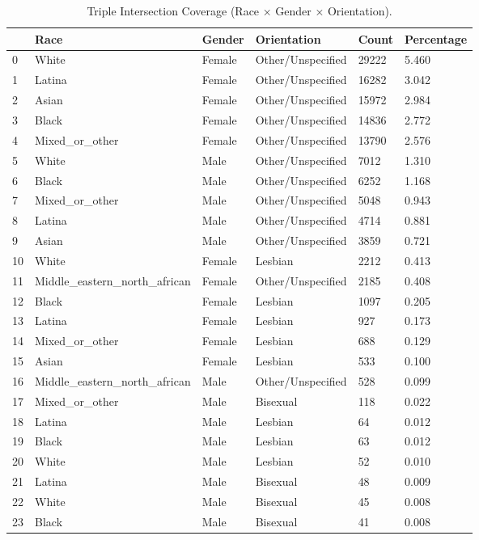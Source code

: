 \begin{table}[htbp]
\centering
\caption{Triple Intersection Coverage (Race × Gender × Orientation).}
\label{tab:eda_intersections_rgo}
\begin{tabular}{llllll}
\toprule
 & Race & Gender & Orientation & Count & Percentage \\
\midrule
0 & White & Female & Other/Unspecified & 29222 & 5.460 \\
1 & Latina & Female & Other/Unspecified & 16282 & 3.042 \\
2 & Asian & Female & Other/Unspecified & 15972 & 2.984 \\
3 & Black & Female & Other/Unspecified & 14836 & 2.772 \\
4 & Mixed\_or\_other & Female & Other/Unspecified & 13790 & 2.576 \\
5 & White & Male & Other/Unspecified & 7012 & 1.310 \\
6 & Black & Male & Other/Unspecified & 6252 & 1.168 \\
7 & Mixed\_or\_other & Male & Other/Unspecified & 5048 & 0.943 \\
8 & Latina & Male & Other/Unspecified & 4714 & 0.881 \\
9 & Asian & Male & Other/Unspecified & 3859 & 0.721 \\
10 & White & Female & Lesbian & 2212 & 0.413 \\
11 & Middle\_eastern\_north\_african & Female & Other/Unspecified & 2185 & 0.408 \\
12 & Black & Female & Lesbian & 1097 & 0.205 \\
13 & Latina & Female & Lesbian & 927 & 0.173 \\
14 & Mixed\_or\_other & Female & Lesbian & 688 & 0.129 \\
15 & Asian & Female & Lesbian & 533 & 0.100 \\
16 & Middle\_eastern\_north\_african & Male & Other/Unspecified & 528 & 0.099 \\
17 & Mixed\_or\_other & Male & Bisexual & 118 & 0.022 \\
18 & Latina & Male & Lesbian & 64 & 0.012 \\
19 & Black & Male & Lesbian & 63 & 0.012 \\
20 & White & Male & Lesbian & 52 & 0.010 \\
21 & Latina & Male & Bisexual & 48 & 0.009 \\
22 & White & Male & Bisexual & 45 & 0.008 \\
23 & Black & Male & Bisexual & 41 & 0.008 \\

\end{tabular}
\end{table}
